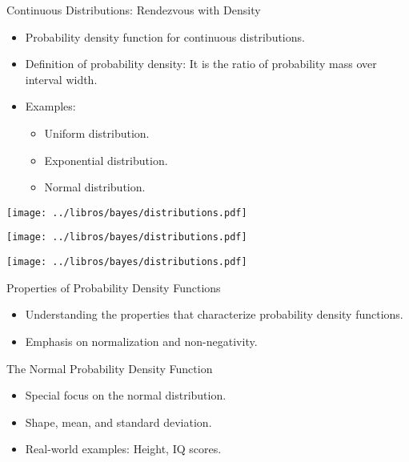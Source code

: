 \documentclass{beamer}
\begin{document}
\begin{frame}{Continuous Distributions: Rendezvous with Density}
  \begin{itemize}
    \item Probability density function for continuous distributions.
    \item Definition of probability density: It is the ratio of probability mass over interval width.
    \item Examples:
      \begin{itemize}
        \item Uniform distribution.
        \item Exponential distribution.
        \item Normal distribution.
      \end{itemize}
  \end{itemize}
\end{frame}


\begin{frame}
\begin{center}
  \texttt{[image: ../libros/bayes/distributions.pdf]}
  \end{center}
\end{frame}

\begin{frame}
\begin{center}
  \texttt{[image: ../libros/bayes/distributions.pdf]}
  \end{center}
\end{frame}

\begin{frame}
\begin{center}
  \texttt{[image: ../libros/bayes/distributions.pdf]}
  \end{center}
\end{frame}


\begin{frame}{Properties of Probability Density Functions}
  \begin{itemize}
    \item Understanding the properties that characterize probability density functions.
    \item Emphasis on normalization and non-negativity.
  \end{itemize}
\end{frame}

\begin{frame}{The Normal Probability Density Function}
  \begin{itemize}
    \item Special focus on the normal distribution.
    \item Shape, mean, and standard deviation.
    \item Real-world examples: Height, IQ scores.
  \end{itemize}
\end{frame}
\end{document}
